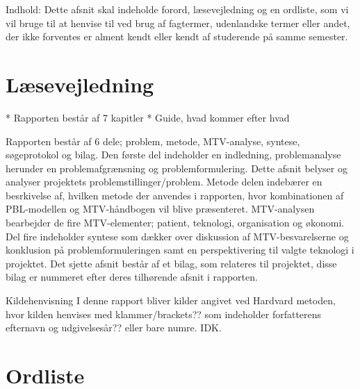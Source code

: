 Indhold: Dette afsnit skal indeholde forord, 
læsevejledning og en ordliste, som vi vil bruge til at henvise til ved brug af fagtermer, udenlandske termer eller andet, der ikke forventes er alment kendt eller kendt af studerende på samme semester. 




\section{Læsevejledning}

* Rapporten består af 7 kapitler 
* Guide, hvad kommer efter hvad

Rapporten består af 6 dele; problem, metode, MTV-analyse, syntese, søgeprotokol og bilag. Den første del indeholder en indledning, problemanalyse herunder en problemafgrænsning og problemformulering. Dette afsnit belyser og analyser projektets problemstillinger/problem.
Metode delen indebærer en besrkivelse af, hvilken metode der anvendes i rapporten, hvor kombinationen af PBL-modellen og MTV-håndbogen vil blive præsenteret. MTV-analysen bearbejder de fire MTV-elementer; patient, teknologi, organisation og økonomi. Del fire indeholder syntese som dækker over diskussion af MTV-besvarelserne og konklusion på problemformuleringen samt en perspektivering til valgte teknologi i projektet. Det sjette afsnit består af et bilag, som relateres til projektet, disse bilag er nummeret efter deres tilhørende afsnit i rapporten.  


Kildehenvisning
I denne rapport bliver kilder angivet ved Hardvard metoden, hvor kilden henvises med klammer/brackets?? som indeholder forfatterens efternavn og udgivelsesår?? eller bare numre. IDK.


\section{Ordliste}